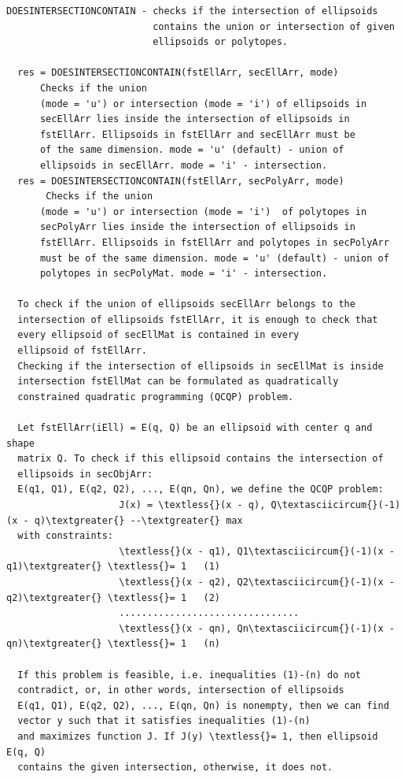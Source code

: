 \documentclass[letterpaper,10pt,english]{sphinxmanual}
\begin{document}
\begin{Verbatim}[commandchars=\\\{\}]
DOESINTERSECTIONCONTAIN - checks if the intersection of ellipsoids
                          contains the union or intersection of given
                          ellipsoids or polytopes.

  res = DOESINTERSECTIONCONTAIN(fstEllArr, secEllArr, mode)
      Checks if the union
      (mode = 'u') or intersection (mode = 'i') of ellipsoids in
      secEllArr lies inside the intersection of ellipsoids in
      fstEllArr. Ellipsoids in fstEllArr and secEllArr must be
      of the same dimension. mode = 'u' (default) - union of
      ellipsoids in secEllArr. mode = 'i' - intersection.
  res = DOESINTERSECTIONCONTAIN(fstEllArr, secPolyArr, mode)
       Checks if the union
      (mode = 'u') or intersection (mode = 'i')  of polytopes in
      secPolyArr lies inside the intersection of ellipsoids in
      fstEllArr. Ellipsoids in fstEllArr and polytopes in secPolyArr
      must be of the same dimension. mode = 'u' (default) - union of
      polytopes in secPolyMat. mode = 'i' - intersection.

  To check if the union of ellipsoids secEllArr belongs to the
  intersection of ellipsoids fstEllArr, it is enough to check that
  every ellipsoid of secEllMat is contained in every
  ellipsoid of fstEllArr.
  Checking if the intersection of ellipsoids in secEllMat is inside
  intersection fstEllMat can be formulated as quadratically
  constrained quadratic programming (QCQP) problem.

  Let fstEllArr(iEll) = E(q, Q) be an ellipsoid with center q and shape
  matrix Q. To check if this ellipsoid contains the intersection of
  ellipsoids in secObjArr:
  E(q1, Q1), E(q2, Q2), ..., E(qn, Qn), we define the QCQP problem:
                    J(x) = \textless{}(x - q), Q\textasciicircum{}(-1)(x - q)\textgreater{} --\textgreater{} max
  with constraints:
                    \textless{}(x - q1), Q1\textasciicircum{}(-1)(x - q1)\textgreater{} \textless{}= 1   (1)
                    \textless{}(x - q2), Q2\textasciicircum{}(-1)(x - q2)\textgreater{} \textless{}= 1   (2)
                    ................................
                    \textless{}(x - qn), Qn\textasciicircum{}(-1)(x - qn)\textgreater{} \textless{}= 1   (n)

  If this problem is feasible, i.e. inequalities (1)-(n) do not
  contradict, or, in other words, intersection of ellipsoids
  E(q1, Q1), E(q2, Q2), ..., E(qn, Qn) is nonempty, then we can find
  vector y such that it satisfies inequalities (1)-(n)
  and maximizes function J. If J(y) \textless{}= 1, then ellipsoid E(q, Q)
  contains the given intersection, otherwise, it does not.


\end{Verbatim}
\end{document}
